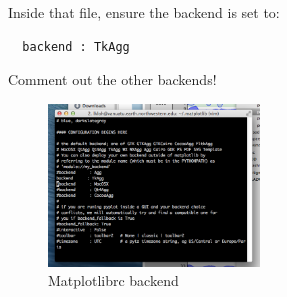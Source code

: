 \documentclass[letterpaper,10pt]{article}
\begin{document}
Inside that file, ensure the backend is set to:

\begin{verbatim}
  backend : TkAgg
\end{verbatim}

Comment out the other backends! 

\begin{figure}[h!]
  \centering
  \includegraphics[width=0.5\textwidth]{images/matplotlibrc_file}
  \caption{Matplotlibrc backend}
  \label{fig:matplotlibrc_file}
\end{figure}






\end{document}
